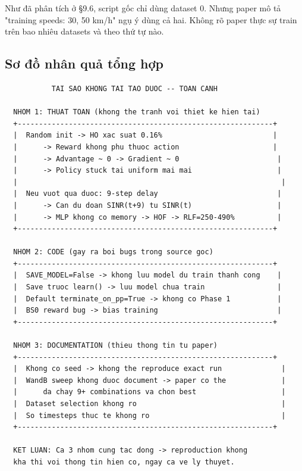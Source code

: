 \documentclass[11pt]{article}
\begin{document}
Như đã phân tích ở \S9.6, script gốc chỉ dùng dataset 0. Nhưng paper mô tả "training speeds: 30, 50 km/h" ngụ ý dùng cả hai. Không rõ paper thực sự train trên bao nhiêu datasets và theo thứ tự nào.

\subsection{Sơ đồ nhân quả tổng hợp}

\begin{lstlisting}
           TAI SAO KHONG TAI TAO DUOC -- TOAN CANH

  NHOM 1: THUAT TOAN (khong the tranh voi thiet ke hien tai)
  +------------------------------------------------------------+
  |  Random init -> HO xac suat 0.16%                          |
  |      -> Reward khong phu thuoc action                      |
  |      -> Advantage ~ 0 -> Gradient ~ 0                       |
  |      -> Policy stuck tai uniform mai mai                    |
  |                                                              |
  |  Neu vuot qua duoc: 9-step delay                            |
  |      -> Can du doan SINR(t+9) tu SINR(t)                    |
  |      -> MLP khong co memory -> HOF -> RLF=250-490%          |
  +------------------------------------------------------------+

  NHOM 2: CODE (gay ra boi bugs trong source goc)
  +------------------------------------------------------------+
  |  SAVE_MODEL=False -> khong luu model du train thanh cong    |
  |  Save truoc learn() -> luu model chua train                 |
  |  Default terminate_on_pp=True -> khong co Phase 1           |
  |  BS0 reward bug -> bias training                            |
  +------------------------------------------------------------+

  NHOM 3: DOCUMENTATION (thieu thong tin tu paper)
  +------------------------------------------------------------+
  |  Khong co seed -> khong the reproduce exact run              |
  |  WandB sweep khong duoc document -> paper co the             |
  |      da chay 9+ combinations va chon best                    |
  |  Dataset selection khong ro                                  |
  |  So timesteps thuc te khong ro                               |
  +------------------------------------------------------------+

  KET LUAN: Ca 3 nhom cung tac dong -> reproduction khong
  kha thi voi thong tin hien co, ngay ca ve ly thuyet.
\end{lstlisting}
\end{document}
